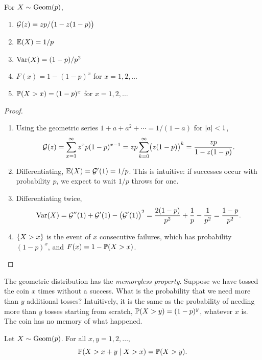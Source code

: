 \begin{theorem}\label{thm:geometric-properties}
For $X \sim \mathrm{Geom}(p)$,
\begin{enumerate}
  \item $\mathcal{G}(z) = zp/\bigl(1 - z(1-p)\bigr)$
  \item $\operatorname{\mathbb{E}}(X) = 1/p$
  \item $\operatorname{Var}(X) = (1-p)/p^2$
  \item $F(x) = 1 - (1 - p)^x$ for $x = 1, 2, \ldots$
  \item $\mathbb{P}(X > x) = (1-p)^x$ for $x = 1, 2, \ldots$
\end{enumerate}
\end{theorem}

\begin{proof}\leavevmode
\begin{enumerate}[leftmargin=2.6em]
  \item[1.] Using the geometric series $1 + a + a^2 + \cdots = 1/(1-a)$ for $\lvert a\rvert < 1$,
\[
  \mathcal{G}(z) = \sum_{x=1}^\infty z^x p (1-p)^{x-1} = zp \sum_{k=0}^\infty \bigl(z(1-p)\bigr)^k = \frac{zp}{1 - z(1-p)}.
\]
  \item[2.] Differentiating, $\operatorname{\mathbb{E}}(X) = \mathcal{G}'(1) = 1/p$. This is intuitive: if successes occur with probability $p$, we expect to wait $1/p$ throws for one.
  \item[3.] Differentiating twice,
\[
  \operatorname{Var}(X) = \mathcal{G}''(1) + \mathcal{G}'(1) - \bigl(\mathcal{G}'(1)\bigr)^2 = \frac{2(1-p)}{p^2} + \frac1p - \frac{1}{p^2} = \frac{1-p}{p^2}.
\]
  \item[4--5.] $\left\{ X > x \right\}$ is the event of $x$ consecutive failures, which has probability $(1-p)^x$, and $F(x) = 1 - \mathbb{P}(X > x)$. \qedhere
\end{enumerate}
\end{proof}

The geometric distribution has the \emph{memoryless property}. Suppose we have tossed the coin $x$ times without a success. What is the probability that we need more than $y$ additional tosses? Intuitively, it is the same as the probability of needing more than $y$ tosses starting from scratch, $\mathbb{P}(X > y) = (1-p)^y$, whatever $x$ is. The coin has no memory of what happened.

\begin{theorem}\label{thm:geometric-memoryless}
Let $X \sim \mathrm{Geom}(p)$. For all $x, y = 1, 2, \ldots$,
\[
  \mathbb{P}(X > x + y \mid X > x) = \mathbb{P}(X > y).
\]
\end{theorem}

